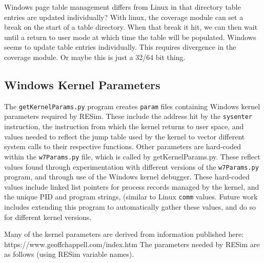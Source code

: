 \documentclass[titlepage]{article}
\begin{document}
\begin{appendices}
Windows page table management differs from Linux in that directory table entries are updated individually? With linux, the coverage module can
set a break on the start of a table directory.  When that break it hit, we can then wait until a return to user mode at which time the
table will be populated.  Windows seems to update table entries individually.  This requires divergence in the coverage module.  Or maybe this is just a 32/64 bit thing.

\subsection{Windows Kernel Parameters}
The {\tt getKernelParams.py} program creates {\tt param} files containing Windows kernel parameters required by RESim.  These include the address hit by the {\tt sysenter} instruction, 
the instruction from which the kernel returns to user space, and values needed to reflect the jump table used by the kernel to vector different system calls to their respective
functions.  Other parameters are hard-coded within the {\tt w7Params.py} file, which is called by getKernelParams.py.  These reflect values found through experimentation with different versions of the {\tt w7Params.py} program,
and through use of the Windows kernel debugger. These hard-coded values include linked list pointers for process records managed by the kernel, 
and the unique PID and program strings, (similar to Linux {\tt comm} values.  Future work includes extending this program to automatically gather these values, and do so for different 
kernel versions.

Many of the kernel parameters are derived from information published here:  https://www.geoffchappell.com/index.htm
The parameters needed by RESim are as follows (using RESim variable names).


\end{appendices}
\end{document}
